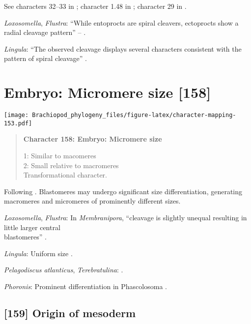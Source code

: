 \documentclass[openany]{book}
\theoremstyle{definition}
\theoremstyle{definition}
\theoremstyle{definition}
\theoremstyle{remark}
\begin{document}
See characters 32--33 in \citet{Haszprunar1996}; character 1.48 in
\citet{SPS1996}; character 29 in \citet{Glenner2004}.

\hypertarget{Flustra-coding-157}{}
\emph{Loxosomella}, \emph{Flustra}: ``While entoprocts are spiral
cleavers, ectoprocts show a radial cleavage pattern'' --
\citet{Fuchs2008}.

\hypertarget{Lingula-coding-157}{}
\emph{Lingula}: ``The observed cleavage displays several characters
consistent with the pattern of spiral cleavage''
\citep{Pennerstorfer2012}.

\section{Embryo: Micromere size
{[}158{]}}\label{embryo-micromere-size-158}

\texttt{[image: Brachiopod\_phylogeny\_files/figure-latex/character-mapping-153.pdf]}

\begin{quote}
\textbf{Character 158: Embryo: Micromere size}

1: Similar to macomeres\\
2: Small relative to macromeres\\
Transformational character.
\end{quote}

Following \citet{Hejnol2010}. Blastomeres may undergo significant size
differentiation, generating macromeres and micromeres of prominently
different sizes.

\hypertarget{Flustra-coding-158}{}
\emph{Loxosomella}, \emph{Flustra}: In \emph{Membranipora}, ``cleavage
is slightly unequal resulting in little larger central\\
blastomeres'' \citep{Gruhl2010M}.

\hypertarget{Lingula-coding-158}{}
\emph{Lingula}: Uniform size \citep{Pennerstorfer2012}.

\hypertarget{Pelagodiscus_atlanticus-coding-158}{}
\emph{Pelagodiscus atlanticus}, \emph{Terebratulina}:
\citet{Williams1997Introduction}.

\hypertarget{Phoronis-coding-158}{}
\emph{Phoronis}: Prominent differentiation in Phascolosoma
\citep{Adrianov2011}.

\subsection*{{[}159{]} Origin of mesoderm}\label{origin-of-mesoderm}
\end{document}
